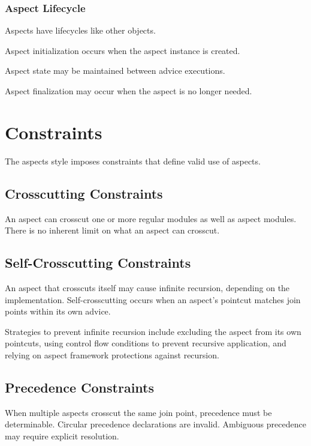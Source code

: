 \documentclass[11pt]{article}
\begin{document}
\subsubsection{Aspect Lifecycle}

Aspects have lifecycles like other objects.

Aspect initialization occurs when the aspect instance is created.

Aspect state may be maintained between advice executions.

Aspect finalization may occur when the aspect is no longer needed.

\section{Constraints}

The aspects style imposes constraints that define valid use of aspects.

\subsection{Crosscutting Constraints}

An aspect can crosscut one or more regular modules as well as aspect modules. There is no inherent limit on what an aspect can crosscut.

\subsection{Self-Crosscutting Constraints}

An aspect that crosscuts itself may cause infinite recursion, depending on the implementation. Self-crosscutting occurs when an aspect's pointcut matches join points within its own advice.

Strategies to prevent infinite recursion include excluding the aspect from its own pointcuts, using control flow conditions to prevent recursive application, and relying on aspect framework protections against recursion.

\subsection{Precedence Constraints}

When multiple aspects crosscut the same join point, precedence must be determinable. Circular precedence declarations are invalid. Ambiguous precedence may require explicit resolution.
\end{document}

